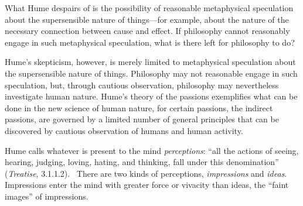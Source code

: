 What Hume despairs of is the possibility of reasonable metaphysical speculation about the supersensible nature of things---for example, about the nature of the necessary connection between cause and effect. If philosophy cannot reasonably engage in such metaphysical speculation, what is there left for philosophy to do?

Hume's skepticism, however, is merely limited to metaphysical speculation about the supersensible nature of things. Philosophy may not reasonable engage in such speculation, but, through cautious observation, philosophy may nevertheless investigate human nature. Hume's theory of the passions exemplifies what can be done in the new science of human nature, for certain passions, the indirect passions, are governed by a limited number of general principles that can be discovered by cautious observation of humans and human activity. \change

% 


Hume calls whatever is present to the mind \emph{perceptions}: ``all the actions of seeing, hearing, judging, loving, hating, and thinking, fall under this denomination'' (\emph{Treatise}, 3.1.1.2). \change\ There are two kinds of perceptions, \emph{impressions} and \emph{ideas}. Impressions enter the mind with greater force or vivacity than ideas, the ``faint images'' of impressions. \change

